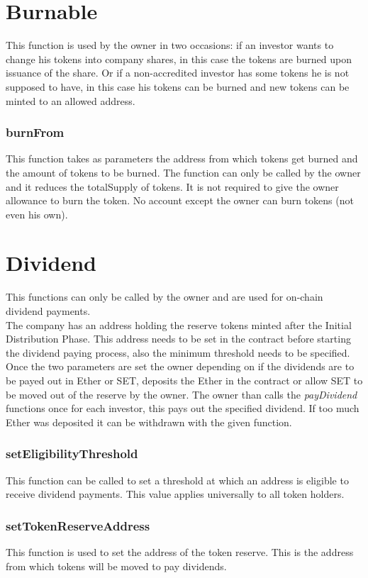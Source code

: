 \documentclass[12pt,a4paper]{article}
\begin{document}
\section*{Burnable}
This function is used by the owner in two occasions: if an investor wants to change his tokens into company shares, in this case the tokens are burned upon issuance of the share. Or if a non-accredited investor has some tokens he is not supposed to have, in this case his tokens can be burned and new tokens can be minted to an allowed address.
\subsubsection*{burnFrom}
This function takes as parameters the address from which tokens get burned and the amount of tokens to be burned. The function can only be called by the owner and it reduces the totalSupply of tokens. It is not required to give the owner allowance to burn the token. No account except the owner can burn tokens (not even his own).
\section*{Dividend}
This functions can only be called by the owner and are used for on-chain dividend payments.\\
The company has an address holding the reserve tokens minted after the Initial Distribution Phase. This address needs to be set in the contract before starting the dividend paying process, also the minimum threshold needs to be specified. Once the two parameters are set the owner depending on if the dividends are to be payed out in Ether or SET, deposits the Ether in the contract or allow SET to be moved out of the reserve by the owner. The owner than calls the \textit{payDividend} functions once for each investor, this pays out the specified dividend. If too much Ether was deposited it can be withdrawn with the given function.
\subsubsection*{setEligibilityThreshold}
This function can be called to set a threshold at which an address is eligible to  receive dividend payments. This value applies universally to all token holders.
\subsubsection*{setTokenReserveAddress}
This function is used to set the address of the token reserve. This is the address from which tokens will be moved to pay dividends. 
\end{document}
